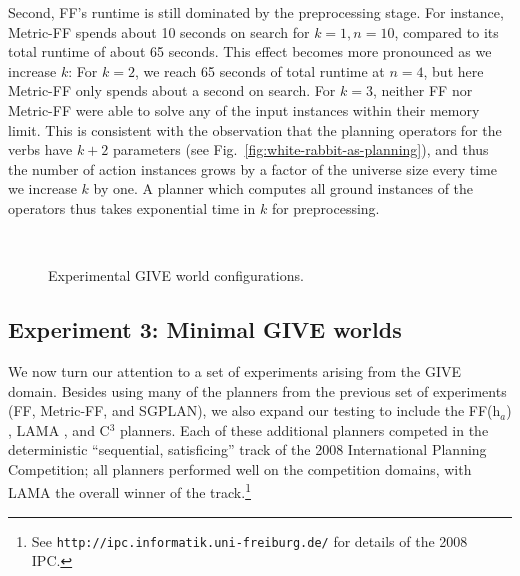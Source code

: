 Second, FF's runtime is still dominated by the preprocessing
stage. For instance, Metric-FF spends about 10 seconds on search for
$k=1,n=10$, compared to its total runtime of about 65 seconds. This
effect becomes more pronounced as we increase $k$: For $k=2$, we reach
65 seconds of total runtime at $n=4$, but here Metric-FF only spends
about a second on search. For $k=3$, neither FF nor Metric-FF were
able to solve any of the input instances within their memory
limit. This is consistent with the observation that the planning
operators for the verbs have $k+2$ parameters (see
Fig.~\ref{fig:white-rabbit-as-planning}), and thus the number of
action instances grows by a factor of the universe size every time we
increase $k$ by one. A planner which computes all ground instances of
the operators thus takes exponential time in $k$ for preprocessing.

\begin{figure}[t]
  \centering
  \qquad
   \\
  \caption{Experimental GIVE world configurations.}
  \label{fig:give-maps}
\end{figure}


\subsection{Experiment 3: Minimal GIVE worlds}
\label{sec:exper-3:-minim}

We now turn our attention to a set of experiments arising from the GIVE domain.
Besides using many of the planners from the previous set of experiments (FF,
Metric-FF, and SGPLAN), we also expand our testing to include the FF(h$_a$)
\citep{keyder08:_ff_h_plann_for_plann}, LAMA \citep{richter08:_lama_plann}, and
C$^3$ \citep{lipovetzky08:_c3} planners. Each of these additional planners
competed in the deterministic ``sequential, satisficing'' track of the 2008
International Planning Competition; all planners performed well on the
competition domains, with LAMA the overall winner of the track.\footnote{See
\texttt{http://ipc.informatik.uni-freiburg.de/} for details of the 2008 IPC.}

